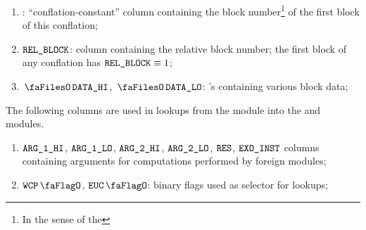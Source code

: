 \begin{enumerate}[resume]
	\item \blockNumberOfFirstBlockInConflation{}:
		``conflation-constant'' column containing the block number\footnote{In the sense of the \evm{}} of the first block of this conflation;
	\item $\texttt{REL\_BLOCK}$:
		column containing the relative block number;
		the first block of any conflation has $\texttt{REL\_BLOCK} \equiv 1$;
	\item $\blockDataHi$, $\blockDataLo$:
		\ccc{}'s containing various block data;
\end{enumerate}
The following columns are used in lookups from the \btcMod{} module into the \wcpMod{} and \eucMod{} modules.
\begin{enumerate}[resume]
	\item $\texttt{ARG}\texttt{\_1}\texttt{\_HI}$, $\texttt{ARG}\texttt{\_1}\texttt{\_LO}$, $\texttt{ARG}\texttt{\_2}\texttt{\_HI}$, $\texttt{ARG}\texttt{\_2}\texttt{\_LO}$, $\texttt{RES}$, $\texttt{EXO\_INST}$
		columns containing arguments for computations performed by foreign modules;
	\item $\wcpFlag$, $\eucFlag$:
		binary flags used as selector for lookups;
\end{enumerate}
